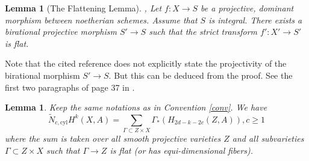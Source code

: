 \documentclass{amsart}
\newtheorem{lem}[theorem]{Lemma}
\theoremstyle{definition}
\theoremstyle{remark}
\newcommand{\cyl}{\text{cyl}}
\begin{document}
\begin{lem}[The Flattening Lemma]{\cite[Page 37]{Platification}, \cite[2.19]{deJong_alteration}}\label{lem:flattening}
    Let $f: X \to S$ be a projective, dominant morphism between noetherian schemes. 
    Assume that $S$ is integral.
    There exists a birational projective morphism $S' \to S$ such that the strict transform $f': X' \to S'$ is flat.
\end{lem}
Note that the cited reference \cite{deJong_alteration} does not explicitly state the projectivity of the birational morphism $S' \to S$.
But this can be deduced from the proof. 
See the first two paragraphs of page 37 in \cite{Platification}.
\begin{lem}\label{cyl_equiv}
    Keep the same notations as in Convention \ref{conv}. We have
    \[
    \tilde{N}_{c, \cyl}H^k(X, A)=\sum_{\Gamma \subset Z \times X}\Gamma_*(H_{2d-k-2c}(Z, A)), c\geq 1
    \]
    where the sum is taken over all smooth projective varieties $Z$ and all subvarieties $\Gamma \subset Z \times X$ such that $\Gamma \to Z$ is  flat (or has equi-dimensional fibers).
\end{lem}
\end{document}
